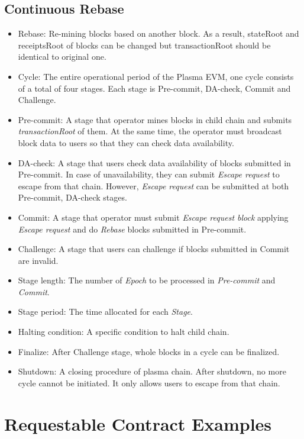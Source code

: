 \documentclass[letterpaper, 11pt]{article}
\begin{document}
\subsection{Continuous Rebase}
\begin{CJK}{UTF8}{mj}
\begin{itemize}
    \item Rebase: Re-mining blocks based on another block. As a result, stateRoot and receiptsRoot of blocks can be changed but transactionRoot should be identical to original one.
   \item Cycle: The entire operational period of the Plasma EVM, one cycle consists of a total of four stages. Each stage is Pre-commit, DA-check, Commit and Challenge.
   \item Pre-commit: A stage that operator mines blocks in child chain and submits \emph{transactionRoot} of them. At the same time, the operator must broadcast block data to users so that they can check data availability.
   \item DA-check: A stage that users check data availability of blocks submitted in Pre-commit. In case of unavailability, they can submit \emph{Escape request} to escape from that chain. However, \emph{Escape request} can be submitted at both Pre-commit, DA-check stages.
   \item Commit: A stage that operator must submit \emph{Escape request block} applying \emph{Escape request} and do \emph{Rebase} blocks submitted in Pre-commit.
   \item Challenge: A stage that users can challenge if blocks submitted in Commit are invalid.
   \item Stage length: The number of \emph{Epoch} to be processed in \emph{Pre-commit} and \emph{Commit}.
   \item Stage period: The time allocated for each \emph{Stage}.
   \item Halting condition: A specific condition to halt child chain.
   \item Finalize: After Challenge stage, whole blocks in a cycle can be finalized.
   \item Shutdown: A closing procedure of plasma chain. After shutdown, no more cycle cannot be initiated. It only allows users to escape from that chain.
\end{itemize}
\end{CJK}

\newpage

\section{Requestable Contract Examples} \label{appendix:requestable-contract-examples}
\end{document}
